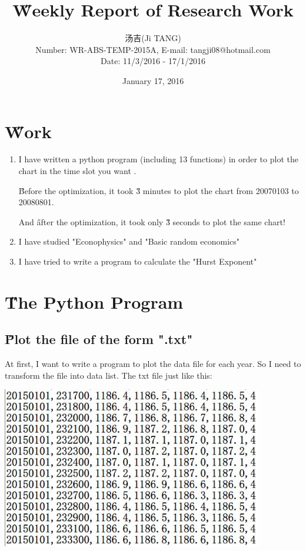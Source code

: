 \documentclass[12pt]{article}
\title{{\H Weekly Report of Research Work\\ }\quad {WR-ABS-TEMP-2015A-No.008}}
\author{汤吉(Ji TANG)\\
               Number: WR-ABS-TEMP-2015A,  E-mail: tangji08@hotmail.com \\
        Date: 11/3/2016 - 17/1/2016}
\date{January 17, 2016}
\begin{document}
  
\maketitle
\pagestyle{fancy}
\fancyhead[LO,RE]{\leftmark} %



\renewcommand{\headrulewidth}{0.4pt}
\renewcommand{\footrulewidth}{0.4pt}



\tableofcontents 
\newpage
\section{\H Work}
\begin{enumerate}
	\item I have written a python program (including 13  functions) in order to plot the chart in the time slot you want .
	
	{\H Before the optimization}, it took {\H 3 minutes} to plot the chart from 20070103 to 20080801.
	
	And {\H after the optimization}, it took only {\H 3 seconds} to plot the same chart!
	\item I have studied "Econophysics" and "Basic random economics"
	\item I have tried to write a program to calculate the "Hurst Exponent"
\end{enumerate}

\section{\H The Python Program}
\subsection{\H Plot the file of the form ".txt"}
At first, I want to write a program to plot the data file for each year. So I need to transform the file into data list. The txt file just like this:

\includegraphics[width = 4.5in]{1.jpg}
\end{document}
